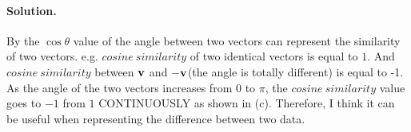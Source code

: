 \paragraph*{Solution.}
By the $\cos\theta$ value of the angle between two vectors can represent the similarity of two vectors.
e.g. $cosine\ similarity$ of two identical vectors is equal to $1$.
And $cosine\ similarity$ between $\vb{v}$ and $-\vb{v}$(the angle is totally different) is equal to -1.
As the angle of the two vectors increases from $0$ to $\pi$, the $cosine\ similarity$ value goes to $-1$ from $1$ CONTINUOUSLY as shown in (c).
Therefore, I think it can be useful when representing the difference between two data.



